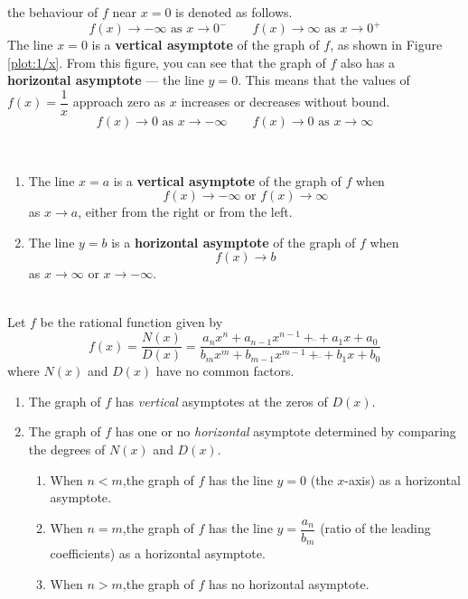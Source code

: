 the behaviour of $f$ near $x=0$ is denoted as follows.
$$
f(x) \to -\infty \text{ as } x \to 0^- 
\qquad
f(x) \to \infty \text{ as } x \to 0^+
$$
The line $x=0$ is a \textbf{vertical asymptote} of the graph of $f$, as shown in Figure \ref{plot:1/x}. From
this figure, you can see that the graph of $f$ also has a \textbf{horizontal asymptote} — the line $y=0$. This means that the values of $f(x)=\dfrac{1}{x}$ approach zero as $x$ increases or decreases without bound.
$$
f(x) \to 0 \text{ as } x \to -\infty 
\qquad
f(x) \to 0 \text{ as } x \to \infty
$$

\begin{definition}
    ~\\ 
    \begin{enumerate}
        \item The line $x=a$ is a \textbf{vertical asymptote} of the graph of $f$ when
        $$f(x) \to -\infty \text{ or } f(x) \to \infty$$
        as $x\to a$, either from the right or from the left.
        \item The line $y=b$ is a \textbf{horizontal asymptote} of the graph of $f$ when
        $$f(x) \to b$$
        as $x\to \infty$ or $x\to -\infty$. 
    \end{enumerate}
    \cite{ci}   
\end{definition}
\clearpage
\begin{proposition}\cite{ci}
    ~\\
    Let $f$ be the rational function given by
    $$f(x)=\dfrac{N(x)}{D(x)} = \dfrac
    {a_nx^n+a_{n-1}x^{n-1}+ \dddot{} +a_1x+a_0}
    {b_mx^m+b_{m-1}x^{m-1}+ \dddot{} +b_1x+b_0}$$ 
    where $N(x)$ and $D(x)$ have no common factors.
    \begin{enumerate}
        \item The graph of $f$ has \textit{vertical} asymptotes at the zeros of $D(x)$.
        \item The graph of $f$ has one or no \textit{horizontal} asymptote determined by comparing the degrees of $N(x)$ and $D(x)$.
        \begin{enumerate}
            \item When $n < m$,the graph of $f$ has the line $y=0$ (the $x$-axis) as a horizontal asymptote.
            \item When $n = m$,the graph of $f$ has the line $y=\dfrac{a_n}{b_m}$ (ratio of the leading coefficients) as a horizontal asymptote.
            \item When $n > m$,the graph of $f$ has no horizontal asymptote.
        \end{enumerate}
    \end{enumerate}
\end{proposition}
